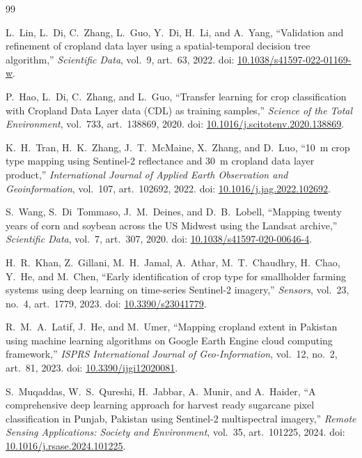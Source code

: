 \begin{thebibliography}{99}

L.~Lin, L.~Di, C.~Zhang, L.~Guo, Y.~Di, H.~Li, and A.~Yang, ``Validation and refinement of cropland
data layer using a spatial-temporal decision tree algorithm,'' \textit{Scientific Data}, vol.~9,
art.~63, 2022. doi: \href{https://doi.org/10.1038/s41597-022-01169-w}{10.1038/s41597-022-01169-w}.

P.~Hao, L.~Di, C.~Zhang, and L.~Guo, ``Transfer learning for crop classification with Cropland Data
Layer data (CDL) as training samples,'' \textit{Science of the Total Environment}, vol.~733,
art.~138869, 2020. doi: \href{https://doi.org/10.1016/j.scitotenv.2020.138869}{10.1016/j.scitotenv.2020.138869}.

K.~H.~Tran, H.~K.~Zhang, J.~T.~McMaine, X.~Zhang, and D.~Luo, ``10~m crop type mapping using
Sentinel-2 reflectance and 30~m cropland data layer product,'' \textit{International Journal of
Applied Earth Observation and Geoinformation}, vol.~107, art.~102692, 2022.
doi: \href{https://doi.org/10.1016/j.jag.2022.102692}{10.1016/j.jag.2022.102692}.

S.~Wang, S.~Di~Tommaso, J.~M.~Deines, and D.~B.~Lobell, ``Mapping twenty years of corn and soybean
across the US Midwest using the Landsat archive,'' \textit{Scientific Data}, vol.~7, art.~307, 2020.
doi: \href{https://doi.org/10.1038/s41597-020-00646-4}{10.1038/s41597-020-00646-4}.

H.~R.~Khan, Z.~Gillani, M.~H.~Jamal, A.~Athar, M.~T.~Chaudhry, H.~Chao, Y.~He, and M.~Chen, ``Early
identification of crop type for smallholder farming systems using deep learning on time-series
Sentinel-2 imagery,'' \textit{Sensors}, vol.~23, no.~4, art.~1779, 2023.
doi: \href{https://doi.org/10.3390/s23041779}{10.3390/s23041779}.

R.~M.~A.~Latif, J.~He, and M.~Umer, ``Mapping cropland extent in Pakistan using machine learning
algorithms on Google Earth Engine cloud computing framework,'' \textit{ISPRS International Journal of
Geo-Information}, vol.~12, no.~2, art.~81, 2023.
doi: \href{https://doi.org/10.3390/ijgi12020081}{10.3390/ijgi12020081}.

S.~Muqaddas, W.~S.~Qureshi, H.~Jabbar, A.~Munir, and A.~Haider, ``A comprehensive deep learning
approach for harvest ready sugarcane pixel classification in Punjab, Pakistan using Sentinel-2
multispectral imagery,'' \textit{Remote Sensing Applications: Society and Environment}, vol.~35,
art.~101225, 2024. doi: \href{https://doi.org/10.1016/j.rsase.2024.101225}{10.1016/j.rsase.2024.101225}.


\end{thebibliography}
